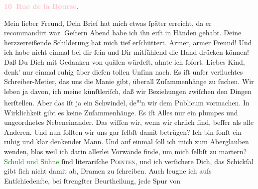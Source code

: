            \pstart
           \begin{otherlanguage}{french}\textcolor{gray}{\textbf{\textbf{\textcolor{pink}{10 Rue de la Bourse}{}\ledrightnote{\textcolor{pink}{rue de la Bourse}}.}}}\end{otherlanguage}\pend
           \pstart\center{}Mein lieber Freund,\pend\pstart
           Dein Brief hat mich etwas ſpäter erreicht, da er recommandirt war. Geſtern{ }Abend habe ich ihn erſt in Händen gehabt. Deine herzzerreißende
               Schilderung hat mich tief erſchüttert. Armer, armer Freund! Und ich habe nicht einmal
               bei dir ſein und Dir mitfühlend die Hand drücken können!\pend
           \pstart
           Daß Du Dich mit Gedanken von \label{K_L02827-1v}\label{K_L02827-1h} quälen würdeſt, ahnte ich ſofort. Liebes Kind, denk’ nur einmal ruhig über
               dieſen tollen Unſinn nach. Es iſt unſer \strikeout{\textcolor{gray}{×}\-\textcolor{gray}{×}\-\textcolor{gray}{×}\-\textcolor{gray}{×}{ }\textcolor{gray}{×}\-\textcolor{gray}{×}\-\textcolor{gray}{×}\-\textcolor{gray}{×}\-\textcolor{gray}{×}\-\textcolor{gray}{×}{ }\textcolor{gray}{×}\-\textcolor{gray}{×}\-\textcolor{gray}{×}\-\textcolor{gray}{×}} verfluchtes Schreiber-{\pb}Metier, das uns die
               Manie gibt, überall Zuſammenhänge zu ſuchen. Wir leben ja davon, ich meine
               künſtleriſch, daß wir Beziehungen zwiſchen den Dingen herſtellen. Aber das iſt ja ein
               Schwindel, de\substVorne{}\textsuperscript{m}\substDazwischen{}n\substHinten{} wir dem Publicum vormachen. In Wirklichkeit gibt es keine Zuſammenhänge. Es
               iſt Alles nur ein plumpes und ungeordnetes Nebeneinander. Das wiſſen wir, wenn wir
               ehrlich ſind, beſſer als alle Anderen. Und nun ſollten wir uns gar ſelbſt damit
               betrügen? Ich bin ſonſt ein ruhig und klar denkender Mann. Und auf einmal ſoll ich
               mich zum Aber{\pb}glauben wenden, blos weil ich darin
               allerlei Vorwände finde\strikeout{\textcolor{gray}{n}}, um mich ſelbſt zu martern? \textcolor{green}{Schuld und Sühne}{} ſind literariſche \textsc{Pointen}, und
               ich verſichere Dich, das Schickſal gibt ſich nicht damit ab, Dramen zu ſchreiben.\pend
           \pstart
           Auch leugne ich aufs Entſchiedenſte, bei ſtrengſter Beurtheilung, jede Spur von
